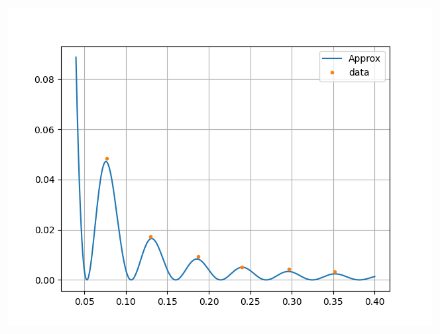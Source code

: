 \begin{figure}[h]
    \centering
    \includegraphics[trim={0 0 0 0},clip,width=\textwidth]{Ex_1/dat.png}
    \caption{}
    \label{dat}
\end{figure}





